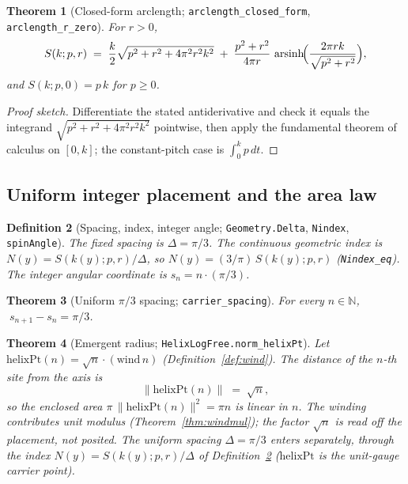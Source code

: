 \documentclass[11pt]{article}
\newtheorem{definition}{Definition}[section]
\newtheorem{theorem}[definition]{Theorem}
\newcommand{\N}{\mathbb{N}}
\newcommand{\code}[1]{\texttt{#1}}
\begin{document}
\begin{theorem}[Closed-form arclength; \code{arclength\_closed\_form}, \code{arclength\_r\_zero}]\label{thm:arclength}
For $r>0$,
\[
  S(k;p,r) \;=\; \frac{k}{2}\sqrt{p^2+r^2+4\pi^2 r^2 k^2}
   \;+\;\frac{p^2+r^2}{4\pi r}\,\operatorname{arsinh}\!\Bigl(\frac{2\pi r k}{\sqrt{p^2+r^2}}\Bigr),
\]
and $S(k;p,0)=p\,k$ for $p\ge 0$.
\end{theorem}

\begin{proof}[Proof sketch]
Differentiate the stated antiderivative and check it equals the integrand
$\sqrt{p^2+r^2+4\pi^2r^2k^2}$ pointwise, then apply the fundamental theorem of calculus on
$[0,k]$; the constant-pitch case is $\int_0^k p\,dt$.
\end{proof}

\subsection{Uniform integer placement and the area law}

\begin{definition}[Spacing, index, integer angle; \code{Geometry.Delta}, \code{Nindex}, \code{spinAngle}]\label{def:placement}
The fixed spacing is $\Delta=\pi/3$. The continuous geometric index is $N(y)=S(k(y);p,r)/\Delta$,
so $N(y)=(3/\pi)\,S(k(y);p,r)$ (\code{Nindex\_eq}). The integer angular coordinate is
$s_n=n\cdot(\pi/3)$.
\end{definition}

\begin{theorem}[Uniform $\pi/3$ spacing; \code{carrier\_spacing}]\label{thm:spacing}
For every $n\in\N$, $\;s_{n+1}-s_n=\pi/3$.
\end{theorem}

\begin{theorem}[Emergent radius; \code{HelixLogFree.norm\_helixPt}]\label{thm:arealaw}
Let $\mathrm{helixPt}(n)=\sqrt n\cdot(\mathrm{wind}\,n)$ (Definition~\ref{def:wind}). The distance of
the $n$-th site from the axis is
\[
  \|\mathrm{helixPt}(n)\| \;=\; \sqrt n,
\]
so the enclosed area $\pi\,\|\mathrm{helixPt}(n)\|^2=\pi n$ is linear in $n$. The winding contributes
unit modulus (Theorem~\ref{thm:windmul}); the factor $\sqrt n$ is read off the placement, not posited.
The uniform spacing $\Delta=\pi/3$ enters separately, through the index $N(y)=S(k(y);p,r)/\Delta$ of
Definition~\ref{def:placement} ($\mathrm{helixPt}$ is the unit-gauge carrier point).
\end{theorem}
\end{document}

